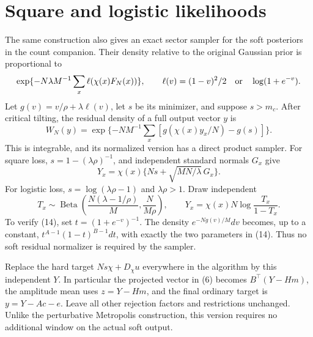 \documentclass[11pt]{article}
\begin{document}
\section{Square and logistic likelihoods}
The same construction also gives an exact sector sampler for the soft
posteriors in the count companion. Their density relative to the original
Gaussian prior is proportional to
\[
 \exp\{-N\lambda M^{-1}\sum_x\ell(\chi(x)F_N(x))\},
 \qquad \ell(v)=(1-v)^2/2\quad\hbox{or}\quad\log(1+e^{-v}).
\]
Let $g(v)=v/\rho+\lambda\ell(v)$, let $s$ be its minimizer, and suppose
$s>m_c$. After critical tilting, the residual density of a full output
vector $y$ is
\[
 W_N(y)=\exp\{-N M^{-1}\sum_x[g(\chi(x)y_x/N)-g(s)]\}.  \tag{12}
\]
This is integrable, and its normalized version has a direct product
sampler. For square loss, $s=1-(\lambda\rho)^{-1}$, and independent
standard normals $G_x$ give
\[
                  Y_x=\chi(x)\{Ns+\sqrt{MN/\lambda}\,G_x\}. \tag{13}
\]
For logistic loss, $s=\log(\lambda\rho-1)$ and $\lambda\rho>1$.
Draw independent
\[
 T_x\sim\operatorname{Beta}\left(\frac{N(\lambda-1/\rho)}M,
                                \frac N{M\rho}\right),\qquad
                  Y_x=\chi(x)N\log\frac{T_x}{1-T_x}.     \tag{14}
\]
To verify (14), set $t=(1+e^{-v})^{-1}$. The density
$e^{-Ng(v)/M}dv$ becomes, up to a constant,
$t^{A-1}(1-t)^{B-1}dt$, with exactly the two parameters in (14).
Thus no soft residual normalizer is required by the sampler.

Replace the hard target $Ns\chi+D_\chi u$ everywhere in the algorithm by
this independent $Y$. In particular the projected vector in (6) becomes
$B^\top(Y-Hm)$, the amplitude mean uses $z=Y-Hm$, and the final ordinary
target is $y=Y-Ac-e$. Leave all other rejection factors and restrictions
unchanged. Unlike the perturbative Metropolis construction, this version
requires no additional window on the actual soft output.
\end{document}
